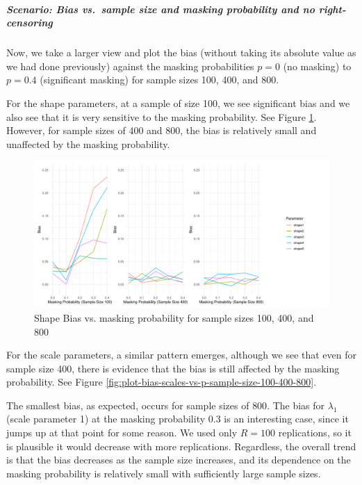 \documentclass[
]{article}
\begin{document}
\hypertarget{scenario-bias-vs.-sample-size-and-masking-probability-and-no-right-censoring}{%
\subparagraph*{Scenario: Bias vs.~sample size and masking probability
and no
right-censoring}\label{scenario-bias-vs.-sample-size-and-masking-probability-and-no-right-censoring}}

Now, we take a larger view and plot the bias (without taking its
absolute value as we had done previously) against the masking
probabilities \(p = 0\) (no masking) to \(p = 0.4\) (significant
masking) for sample sizes 100, 400, and 800.

For the shape parameters, at a sample of size 100, we see significant
bias and we also see that it is very sensitive to the masking
probability. See Figure
\ref{fig:plot-bias-shapes-vs-p-sample-size-100-400-800}. However, for
sample sizes of 400 and 800, the bias is relatively small and unaffected
by the masking probability.

\begin{figure}

{\centering \includegraphics{image/plot-bias-shapes-p-vs-sample-size-100-400-800} 

}

\caption{Shape Bias vs. masking probability for sample sizes 100, 400, and 800}\label{fig:plot-bias-shapes-vs-p-sample-size-100-400-800}
\end{figure}

For the scale parameters, a similar pattern emerges, although we see
that even for sample size 400, there is evidence that the bias is still
affected by the masking probability. See Figure
\ref{fig:plot-bias-scales-vs-p-sample-size-100-400-800}.

The smallest bias, as expected, occurs for sample sizes of \(800\). The
bias for \(\lambda_1\) (scale parameter 1) at the masking probability
\(0.3\) is an interesting case, since it jumps up at that point for some
reason. We used only \(R = 100\) replications, so it is plausible it
would decrease with more replications. Regardless, the overall trend is
that the bias decreases as the sample size increases, and its dependence
on the masking probability is relatively small with sufficiently large
sample sizes.
\end{document}
